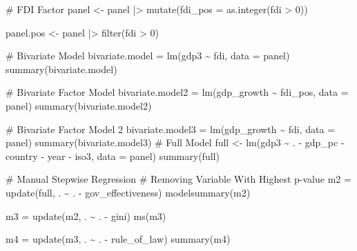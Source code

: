 \documentclass[
  letterpaper,
  DIV=11,
  numbers=noendperiod]{scrartcl}
\newenvironment{Shaded}{\begin{snugshade}}{\end{snugshade}}
\newcommand{\AttributeTok}[1]{\textcolor[rgb]{0.40,0.45,0.13}{#1}}
\newcommand{\CommentTok}[1]{\textcolor[rgb]{0.37,0.37,0.37}{#1}}
\newcommand{\DecValTok}[1]{\textcolor[rgb]{0.68,0.00,0.00}{#1}}
\newcommand{\FunctionTok}[1]{\textcolor[rgb]{0.28,0.35,0.67}{#1}}
\newcommand{\NormalTok}[1]{\textcolor[rgb]{0.00,0.23,0.31}{#1}}
\newcommand{\OtherTok}[1]{\textcolor[rgb]{0.00,0.23,0.31}{#1}}
\newcommand{\SpecialCharTok}[1]{\textcolor[rgb]{0.37,0.37,0.37}{#1}}
\renewcommand{\CommentTok}[1]{\textcolor[rgb]{0.60,0.20,0.20}{#1}}
\begin{document}
\begin{Shaded}
\begin{Highlighting}[]
\CommentTok{\# FDI Factor}
\NormalTok{panel }\OtherTok{\textless{}{-}}\NormalTok{ panel }\SpecialCharTok{|\textgreater{}} 
  \FunctionTok{mutate}\NormalTok{(}\AttributeTok{fdi\_pos =} \FunctionTok{as.integer}\NormalTok{(fdi }\SpecialCharTok{\textgreater{}} \DecValTok{0}\NormalTok{))}

\NormalTok{panel.pos }\OtherTok{\textless{}{-}}\NormalTok{ panel }\SpecialCharTok{|\textgreater{}} \FunctionTok{filter}\NormalTok{(fdi }\SpecialCharTok{\textgreater{}} \DecValTok{0}\NormalTok{)}

\CommentTok{\# Bivariate Model}
\NormalTok{bivariate.model }\OtherTok{=} \FunctionTok{lm}\NormalTok{(gdp3 }\SpecialCharTok{\textasciitilde{}}\NormalTok{ fdi, }\AttributeTok{data =}\NormalTok{ panel)}
\FunctionTok{summary}\NormalTok{(bivariate.model)}

\CommentTok{\# Bivariate Factor Model}
\NormalTok{bivariate.model2 }\OtherTok{=} \FunctionTok{lm}\NormalTok{(gdp\_growth }\SpecialCharTok{\textasciitilde{}}\NormalTok{ fdi\_pos, }\AttributeTok{data =}\NormalTok{ panel)}
\FunctionTok{summary}\NormalTok{(bivariate.model2)}

\CommentTok{\# Bivariate Factor Model 2}
\NormalTok{bivariate.model3 }\OtherTok{=} \FunctionTok{lm}\NormalTok{(gdp\_growth }\SpecialCharTok{\textasciitilde{}}\NormalTok{ fdi, }\AttributeTok{data =}\NormalTok{ panel)}
\FunctionTok{summary}\NormalTok{(bivariate.model3)}
\CommentTok{\# Full Model}
\NormalTok{full }\OtherTok{\textless{}{-}} \FunctionTok{lm}\NormalTok{(gdp3 }\SpecialCharTok{\textasciitilde{}}\NormalTok{ . }\SpecialCharTok{{-}}\NormalTok{ gdp\_pc }\SpecialCharTok{{-}}\NormalTok{ country }\SpecialCharTok{{-}}\NormalTok{ year }\SpecialCharTok{{-}}\NormalTok{ iso3, }\AttributeTok{data =}\NormalTok{ panel)}
\FunctionTok{summary}\NormalTok{(full)}

\CommentTok{\# Manual Stepwise Regression}
\CommentTok{\# Removing Variable With Highest p{-}value}
\NormalTok{m2 }\OtherTok{=} \FunctionTok{update}\NormalTok{(full, . }\SpecialCharTok{\textasciitilde{}}\NormalTok{ . }\SpecialCharTok{{-}}\NormalTok{ gov\_effectiveness)}
\FunctionTok{modelsummary}\NormalTok{(m2)}

\NormalTok{m3 }\OtherTok{=} \FunctionTok{update}\NormalTok{(m2, . }\SpecialCharTok{\textasciitilde{}}\NormalTok{ . }\SpecialCharTok{{-}}\NormalTok{ gini)}
\FunctionTok{ms}\NormalTok{(m3)}

\NormalTok{m4 }\OtherTok{=} \FunctionTok{update}\NormalTok{(m3, . }\SpecialCharTok{\textasciitilde{}}\NormalTok{ . }\SpecialCharTok{{-}}\NormalTok{ rule\_of\_law)}
\FunctionTok{summary}\NormalTok{(m4)}


\end{Highlighting}
\end{Shaded}
\end{document}
